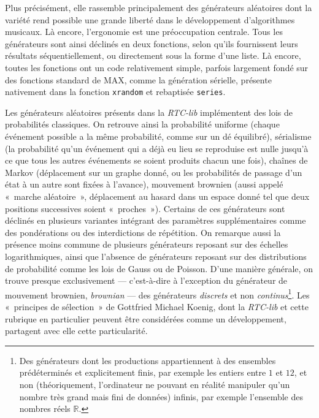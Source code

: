 \documentclass[a4paper,12pt]{article}
\newcommand{\guill}[1]{«~#1~»}
\begin{document}
Plus précisément, elle rassemble principalement des générateurs aléatoires dont la variété rend possible une grande liberté dans le développement d'algorithmes musicaux. Là encore, l'ergonomie est une préoccupation centrale. Tous les générateurs sont ainsi déclinés en deux fonctions, selon qu'ils fournissent leurs résultats séquentiellement, ou directement sous la forme d'une liste. Là encore, toutes les fonctions ont un code relativement simple, parfois largement fondé sur des fonctions standard de MAX, comme la génération sérielle, présente nativement dans la fonction \texttt{xrandom} et rebaptisée \texttt{series}.

Les générateurs aléatoires présents dans la \emph{RTC-lib} implémentent des lois de probabilités classiques. On retrouve ainsi la probabilité uniforme (chaque événement possible a la même probabilité, comme sur un dé équilibré), sérialisme (la probabilité qu'un événement qui a déjà eu lieu se reproduise est nulle jusqu'à ce que tous les autres événements se soient produits chacun une fois), chaînes de Markov (déplacement sur un graphe donné, ou les probabilités de passage d'un état à un autre sont fixées à l'avance), mouvement brownien (aussi appelé \guill{marche aléatoire}, déplacement au hasard dans un espace donné tel que deux positions successives soient \guill{proches}). Certains de ces générateurs sont déclinés en plusieurs variantes intégrant des paramètres supplémentaires comme des pondérations ou des interdictions de répétition. On remarque aussi la présence moins commune de plusieurs générateurs reposant sur des échelles logarithmiques, ainsi que l'absence de générateurs reposant sur des distributions de probabilité comme les lois de Gauss ou de Poisson. D'une manière générale, on trouve presque exclusivement --- c'est-à-dire à l'exception du générateur de mouvement brownien, \emph{brownian} --- des générateurs \emph{discrets} et non \emph{continus}\footnote{Des générateurs dont les productions appartiennent à des ensembles prédéterminés et explicitement finis, par exemple les entiers entre $1$ et $12$, et non (théoriquement, l'ordinateur ne pouvant en réalité manipuler qu'un nombre très grand mais fini de données) infinis, par exemple l'ensemble des nombres réels $\mathbb{R}$.}. Les \guill{principes de sélection} de Gottfried Michael Koenig, dont la \emph{RTC-lib} et cette rubrique en particulier peuvent être considérées comme un développement, partagent avec elle cette particularité.
\end{document}
